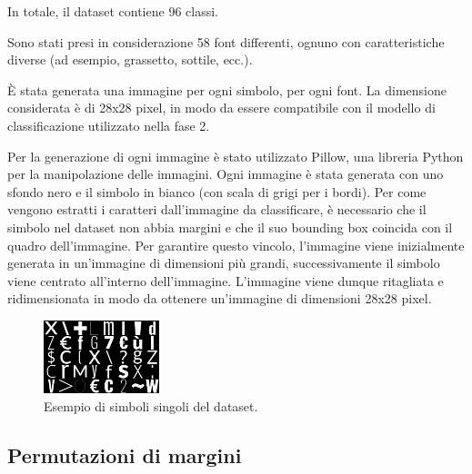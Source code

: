 In totale, il dataset contiene 96 classi.

Sono stati presi in considerazione 58 font differenti, ognuno con caratteristiche diverse (ad esempio, grassetto, sottile, ecc.).

È stata generata una immagine per ogni simbolo, per ogni font. La dimensione considerata è di 28x28 pixel, in modo da essere compatibile con il modello di classificazione utilizzato nella fase 2.

Per la generazione di ogni immagine è stato utilizzato Pillow, una libreria Python per la manipolazione delle immagini. Ogni immagine è stata generata con uno sfondo nero e il simbolo in bianco (con scala di grigi per i bordi). Per come vengono estratti i caratteri dall'immagine da classificare, è necessario che il simbolo nel dataset non abbia margini e che il suo bounding box coincida con il quadro dell'immagine. Per garantire questo vincolo, l'immagine viene inizialmente generata in un'immagine di dimensioni più grandi, successivamente il simbolo viene centrato all'interno dell'immagine. L'immagine viene dunque ritagliata e ridimensionata in modo da ottenere un'immagine di dimensioni 28x28 pixel.
\begin{figure}[H]
	\centering
	\includegraphics[width=0.3\textwidth]{images/dataset-symbols.png}
	\caption{Esempio di simboli singoli del dataset.}
	\label{fig:dataset-symbols}
\end{figure}

\subsection{Permutazioni di margini}


